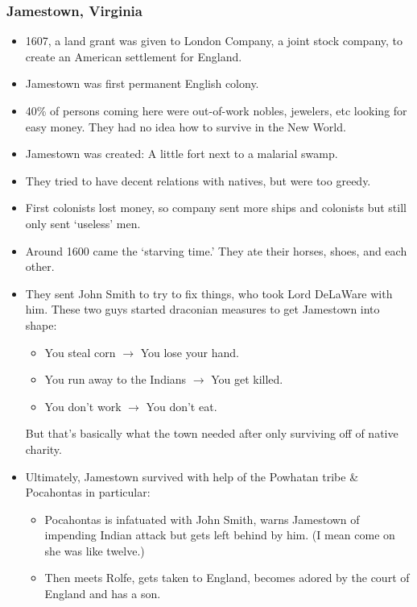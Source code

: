 \documentclass{article}
\begin{document}
      \subsubsection{Jamestown, Virginia}
        \begin{itemize}
          \item 1607, a land grant was given to London Company, a joint stock company, to create an American settlement for England.
          \item Jamestown was first permanent English colony.
          \item 40\% of persons coming here were out-of-work nobles, jewelers, etc looking for easy money. They had no idea how to survive in the New World.
          \item Jamestown was created: A little fort next to a malarial swamp.
          \item They tried to have decent relations with natives, but were too greedy.
          \item First colonists lost money, so company sent more ships and colonists but still only sent `useless' men.
          \item Around 1600 came the `starving time.' They ate their horses, shoes, and each other.
          \item They sent John Smith to try to fix things, who took Lord DeLaWare with him. These two guys started draconian measures to get Jamestown into shape:
            \begin{itemize}
              \item You steal corn $\rightarrow$ You lose your hand.
              \item You run away to the Indians $\rightarrow$ You get killed.
              \item You don't work $\rightarrow$ You don't eat.
            \end{itemize}
            But that's basically what the town needed after only surviving off of native charity.
          \item Ultimately, Jamestown survived with help of the Powhatan tribe \& Pocahontas in particular:
            \begin{itemize}
              \item Pocahontas is infatuated with John Smith, warns Jamestown of impending Indian attack but gets left behind by him. (I mean come on she was like twelve.)
              \item Then meets Rolfe, gets taken to England, becomes adored by the court of England and has a son.

\end{itemize}
\end{itemize}
\end{document}
